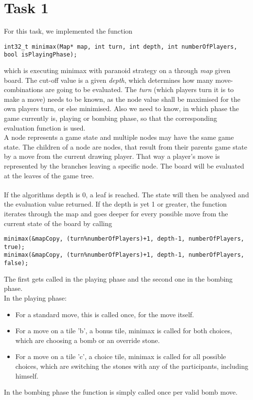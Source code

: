 \section{Task 1}

For this task, we implemented the function 
\begin{lstlisting}[frame=none, numbers=none]
int32_t minimax(Map* map, int turn, int depth, int numberOfPlayers, bool isPlayingPhase);
\end{lstlisting}
which is executing minimax with paranoid strategy on a through \emph{map} given board. 
The cut-off value is a given \emph{depth}, which determines how many move-combinations are going to be evaluated. The \emph{turn} (which players turn it is to make a move) needs to be known, as the node value shall be maximised for the own players turn, or else minimised. Also we need to know, in which phase the game currently is, playing or bombing phase, so that the corresponding evaluation function is used. \\
A node represents a game state and multiple nodes may have the same game state. The children of a node are nodes, that result from their parents game state by a move from the current drawing player. That way a player's move is represented by the branches leaving a specific node. The board will be evaluated at the leaves of the game tree. 
\\\\
If the algorithms depth is 0, a leaf is reached. The state will then be analysed and the evaluation value returned. If the depth is yet 1 or greater, the function iterates through the map and goes deeper for every possible move from the current state of the board by calling 
\begin{lstlisting}[frame=none, numbers=none]
minimax(&mapCopy, (turn%numberOfPlayers)+1, depth-1, numberOfPlayers, true);
minimax(&mapCopy, (turn%numberOfPlayers)+1, depth-1, numberOfPlayers, false);
\end{lstlisting}
The first gets called in the playing phase and the second one in the bombing phase. \\

\noindent In the playing phase:
\begin{itemize}
	\item For a standard move, this is called once, for the move itself.
	\item For a move on a tile 'b', a bonus tile, minimax is called for both choices, which are choosing a bomb or an override stone. 
	\item For a move on a tile 'c', a choice tile, minimax is called for all possible choices, which are switching the stones with any of the participants, including himself.
\end{itemize}
In the bombing phase the function is simply called once per valid bomb move. 
